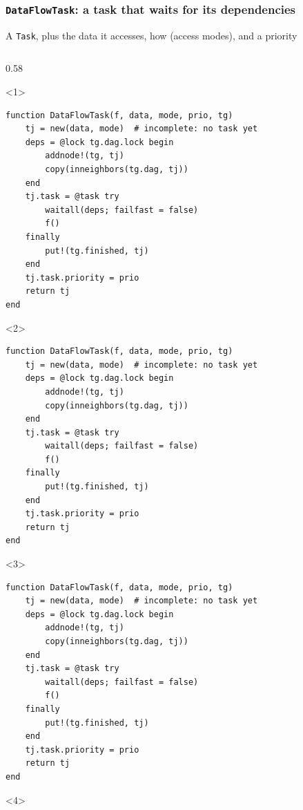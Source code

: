 \documentclass{beamer}
\begin{document}
\begin{frame}[fragile]
	\frametitle{\texttt{DataFlowTask}: a task that waits for its dependencies}
	A \texttt{Task}, plus the data it accesses, how (access modes), and a priority

	\medskip
	\begin{columns}[T]
		\begin{column}{0.58\textwidth}
			\begin{onlyenv}<1>
				\begin{verbatim}
function DataFlowTask(f, data, mode, prio, tg)
    tj = new(data, mode)  # incomplete: no task yet
    deps = @lock tg.dag.lock begin
        addnode!(tg, tj)
        copy(inneighbors(tg.dag, tj))
    end
    tj.task = @task try
        waitall(deps; failfast = false)
        f()
    finally
        put!(tg.finished, tj)
    end
    tj.task.priority = prio
    return tj
end
				\end{verbatim}
			\end{onlyenv}
			\begin{onlyenv}<2>
				\begin{verbatim}
function DataFlowTask(f, data, mode, prio, tg)
    tj = new(data, mode)  # incomplete: no task yet
    deps = @lock tg.dag.lock begin
        addnode!(tg, tj)
        copy(inneighbors(tg.dag, tj))
    end
    tj.task = @task try
        waitall(deps; failfast = false)
        f()
    finally
        put!(tg.finished, tj)
    end
    tj.task.priority = prio
    return tj
end
				\end{verbatim}
			\end{onlyenv}
			\begin{onlyenv}<3>
				\begin{verbatim}
function DataFlowTask(f, data, mode, prio, tg)
    tj = new(data, mode)  # incomplete: no task yet
    deps = @lock tg.dag.lock begin
        addnode!(tg, tj)
        copy(inneighbors(tg.dag, tj))
    end
    tj.task = @task try
        waitall(deps; failfast = false)
        f()
    finally
        put!(tg.finished, tj)
    end
    tj.task.priority = prio
    return tj
end
				\end{verbatim}
			\end{onlyenv}
			\begin{onlyenv}<4>

\end{onlyenv}
\end{column}
\end{columns}
\end{frame}
\end{document}
